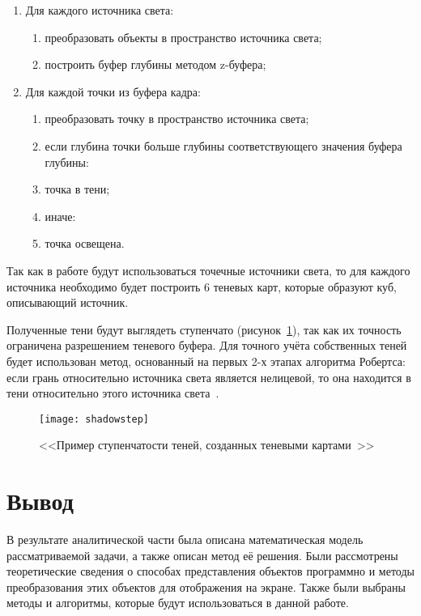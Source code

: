 \begin{enumerate}
	\item Для каждого источника света:
	\begin{enumerate}
		\item преобразовать объекты в пространство источника света;
		\item построить буфер глубины методом z-буфера;
	\end{enumerate}
	
	\item Для каждой точки из буфера кадра:
	\begin{enumerate}
		\item преобразовать точку в пространство источника света;
		\item если глубина точки больше глубины соответствующего значения буфера глубины:
		\item точка в тени;
		\item иначе:
		\item точка освещена. 
	\end{enumerate}
\end{enumerate}

Так как в работе будут использоваться точечные источники света, то для каждого источника необходимо будет построить 6 теневых карт, которые образуют куб, описывающий источник.

Полученные тени будут выглядеть ступенчато (рисунок~\ref{fig:shadowstep}), так как их точность ограничена разрешением теневого буфера. Для точного учёта собственных теней будет использован метод, основанный на первых 2-х этапах алгоритма Робертса: если грань относительно источника света является нелицевой, то она находится в тени относительно этого источника света~\cite{rodgers}.

\begin{figure}[H]
	\centering
	\texttt{[image: shadowstep]}
	\caption{<<Пример ступенчатости теней, созданных теневыми картами~\cite{shadowstep}>>}
	\label{fig:shadowstep}
\end{figure}


\section*{Вывод}

В результате аналитической части была описана математическая модель рассматриваемой задачи, а также описан метод её решения. Были рассмотрены теоретические сведения о способах представления объектов программно и методы преобразования этих объектов для отображения на экране. Также были выбраны методы и алгоритмы, которые будут использоваться в данной работе.

\clearpage
